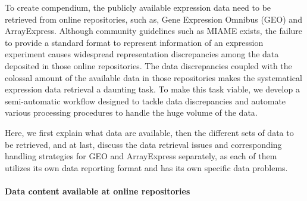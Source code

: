 

To create compendium, the publicly available expression data need to be
retrieved from online repositories, such as, Gene Expression Omnibus (GEO)
and ArrayExpress.
%
Although community guidelines such as MIAME \cite{Brazma2001} exists, the
failure to provide a standard format to represent information of an expression
experiment causes widespread representation discrepancies among the data
deposited in those online repositories.
%
The data discrepancies coupled with the colossal amount of the available data
in those repositories makes the systematical expression data retrieval a
daunting task.
%
To make this task viable, we develop a semi-automatic workflow designed to
tackle data discrepancies and automate various processing procedures to handle
the huge volume of the data.


Here, we first explain what data are available, then the different sets of data
to be retrieved, and at last, discuss the data retrieval issues and 
corresponding handling strategies for GEO and ArrayExpress separately, as each 
of them utilizes its own data reporting format and has its own specific data 
problems.



\paragraph{Data content available at online repositories}\label{sec:command-data-content-online}

